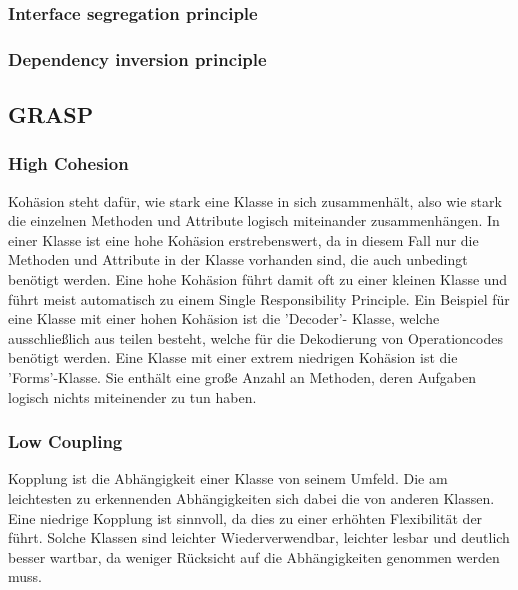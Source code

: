 \documentclass[12pt,a4paper,titlepage,ngerman,pdftex]{report}
\begin{document}
    \subsubsection{Interface segregation principle}

    \subsubsection{Dependency inversion principle}

    \subsection{GRASP}

    \subsubsection{High Cohesion}

    Kohäsion steht dafür, wie stark eine Klasse in sich zusammenhält, also wie stark die einzelnen Methoden und Attribute logisch miteinander zusammenhängen. In einer Klasse ist eine hohe Kohäsion erstrebenswert, da in diesem Fall nur die Methoden und Attribute in der Klasse vorhanden sind, die auch unbedingt benötigt werden.
    Eine hohe Kohäsion führt damit oft zu einer kleinen Klasse und führt meist automatisch zu einem Single Responsibility Principle. Ein Beispiel für eine Klasse mit einer hohen Kohäsion ist die 'Decoder'- Klasse, welche ausschließlich aus teilen besteht, welche für die Dekodierung von Operationcodes benötigt werden. 
    Eine Klasse mit einer extrem niedrigen Kohäsion ist die 'Forms'-Klasse. Sie enthält eine große Anzahl an Methoden, deren Aufgaben logisch nichts miteinender zu tun haben.  

    \subsubsection{Low Coupling}
    
    Kopplung ist die Abhängigkeit einer Klasse von seinem Umfeld. Die am leichtesten zu erkennenden Abhängigkeiten sich dabei die von anderen Klassen. Eine niedrige Kopplung ist sinnvoll, da dies zu einer erhöhten Flexibilität der führt. Solche Klassen sind leichter Wiederverwendbar, leichter lesbar und deutlich besser wartbar, da weniger Rücksicht auf die Abhängigkeiten genommen werden muss. 
    

    
\end{document}
